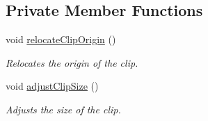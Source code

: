 \subsection*{Private Member Functions}
\begin{CompactItemize}
\item 
void \hyperlink{class_clip_66fc93c15de96d077d2242a53576528e}{relocateClipOrigin} ()
\begin{CompactList}\small\item\em Relocates the origin of the clip. \item\end{CompactList}\item 
void \hyperlink{class_clip_e050cf90340e9160f79688627d69a00b}{adjustClipSize} ()
\begin{CompactList}\small\item\em Adjusts the size of the clip. \item\end{CompactList}\end{CompactItemize}
